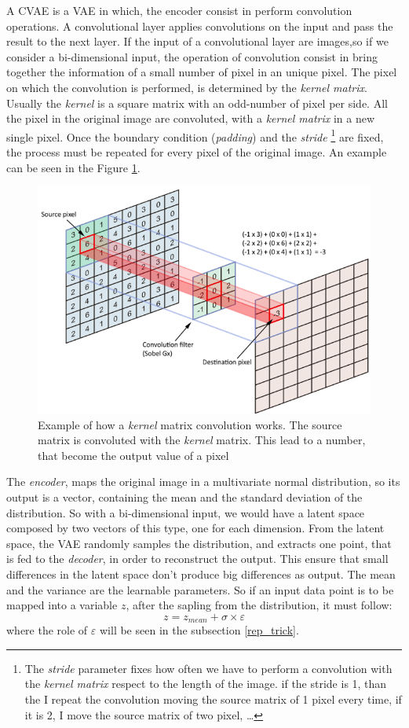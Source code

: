 \documentclass[12pt,a4paper,twocolumn]{article}
\begin{document}
			A CVAE  is a VAE in which, the encoder consist in perform convolution operations. A convolutional layer applies convolutions on the input and pass the result to the next layer. If the input of a convolutional layer are images,so if we consider a bi-dimensional input, the operation of convolution consist in bring together the information of a small number of pixel in an unique pixel. The pixel on which the convolution is performed, is determined by the \emph{kernel matrix}. Usually the \emph{kernel} is a square matrix with an odd-number of pixel per side. All the pixel in the original image are convoluted, with a \emph{kernel matrix} in a new single pixel. Once the boundary condition (\emph{padding}) and the \emph{stride} \footnote{The \emph{stride} parameter fixes how often we have to perform a convolution with the \emph{kernel matrix} respect to the length of the image. if the stride is 1, than the I repeat the convolution moving the source matrix of 1 pixel every time, if it is 2, I move the source matrix of two pixel, \dots} are fixed, the process must be repeated for every pixel of the original image. An example can be seen in the Figure \ref{fig:kernel}. 
			\begin{figure}[t]
				\centering
				\includegraphics[width=0.7\linewidth]{images/kernel}
				\caption{Example of how a \emph{kernel} matrix convolution works. The source matrix is convoluted with the \emph{kernel} matrix. This lead to a number, that become the output value of a pixel}
				\label{fig:kernel}
			\end{figure}
			
			The \emph{encoder}, maps the original image in a multivariate normal distribution, so its output is a vector, containing the mean and the standard deviation of the distribution. So with a bi-dimensional input, we would have a latent space composed by two vectors of this type, one for each dimension.  From the latent space, the VAE randomly samples the distribution, and extracts one point, that is fed to the \emph{decoder}, in order to reconstruct the output. This ensure that small differences in the latent space don't produce big differences as output. The mean and the variance are the learnable parameters. So if an input data point is to be mapped into a variable $z$, after the sapling from the distribution, it must follow: $$z = z_{mean} + \sigma\times\varepsilon$$ where the role of $\varepsilon$ will be seen in the subsection \ref{rep_trick}.
		
\end{document}
